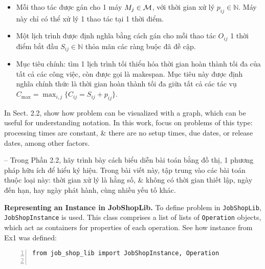 \documentclass{article}
\begin{document}
\begin{itemize}
\begin{itemize}
        \item Mỗi thao tác được gán cho 1 máy $M_j\in{\cal M}$, với thời gian xử lý $p_{ij}\in\mathbb{N}$. Máy này chỉ có thể xử lý 1 thao tác tại 1 thời điểm.
        \item Một lịch trình được định nghĩa bằng cách gán cho mỗi thao tác $O_{ij}$ 1 thời điểm bắt đầu $S_{ij}\in\mathbb{N}$ thỏa mãn các ràng buộc đã đề cập.
        \item Mục tiêu chính: tìm 1 lịch trình tối thiểu hóa thời gian hoàn thành tối đa của tất cả các công việc, còn được gọi là makespan. Mục tiêu này được định nghĩa chính thức là thời gian hoàn thành tối đa giữa tất cả các tác vụ $C_{\max} = \max_{i,j}\{C_{ij} = S_{ij} + p_{ij}\}$.
    \end{itemize}
    In Sect. 2.2, show how problem can be visualized with a graph, which can be useful for understanding notation. In this work, focus on problems of this type: processing times are constant, \& there are no setup times, due dates, or release dates, among other factors.

    -- Trong Phần 2.2, hãy trình bày cách biểu diễn bài toán bằng đồ thị, 1 phương pháp hữu ích để hiểu ký hiệu. Trong bài viết này, tập trung vào các bài toán thuộc loại này: thời gian xử lý là hằng số, \& không có thời gian thiết lập, ngày đến hạn, hay ngày phát hành, cùng nhiều yếu tố khác.

    {\bf Representing an Instance in JobShopLib.} To define problem in {\tt JobShopLib}, {\tt JobShopInstance} is used. This class comprises a list of lists of {\tt Operation} objects, which act as containers for properties of each operation. See how instance from Ex1 was defined:
    \begin{Verbatim}[numbers=left,xleftmargin=5mm]
from job_shop_lib import JobShopInstance, Operation


\end{Verbatim}
\end{itemize}
\end{document}
